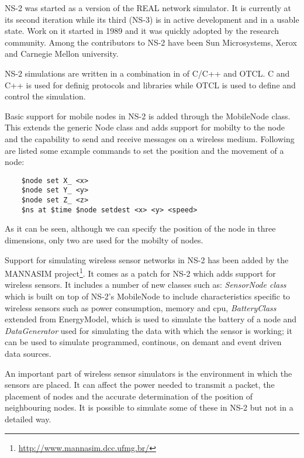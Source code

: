 \label{subsec:ns2}

NS-2 was started as a version of the REAL network simulator. It is currently at its 
second iteration while its third (NS-3) is in active development and in a usable state.
Work on it started in 1989 and it was quickly adopted by the research community.
Among the contributors to NS-2 have been Sun Microsystems, Xerox and Carnegie Mellon 
university. 

NS-2 simulations are written in a combination in of C/C++ and OTCL. C and C++ is 
used for definig protocols and libraries while OTCL is used to define and control
the simulation.

Basic support for mobile nodes in NS-2 is added through the MobileNode class. This extends
the generic Node class and adds support for mobilty to the node and the capability to
send and receive messages on a wireless medium. 
Following are listed some example commands to set the position and the movement of a node:
\lstset{numbers=none,captionpos=b,frame=single,language=C,caption=Commands to set the position and movement of a node,label=lst:saddrule}
\begin{lstlisting}
	$node set X_ <x>
	$node set Y_ <y>
	$node set Z_ <z>
	$ns at $time $node setdest <x> <y> <speed>
\end{lstlisting}
As it can be seen, although we can specify the position of the node in three dimensions,
only two are used for the mobilty of nodes.

Support for simulating wireless sensor networks in NS-2 has been added by the 
MANNASIM project\footnote{\url{http://www.mannasim.dcc.ufmg.br/}}. It comes as
a patch for NS-2 which adds support for wireless sensors. It includes a number of
new classes such as: \textit{SensorNode class} which is built on top of NS-2's MobileNode 
to include characteristics specific to wireless sensors such as power 
consumption, memory and cpu, \textit{BatteryClass} extended from EnergyModel, 
which is used to simulate
the battery of a node and \textit{DataGenerator} used for simulating the data 
with which the sensor is
working; it can be used to simulate programmed, continous, on demant and event 
driven
data sources.



An important part of wireless sensor simulators is the environment in which the sensors
are placed. It can affect the power needed to transmit a packet, the placement of nodes
and the accurate determination of the position of neighbouring nodes. It is possible to
simulate some of these in NS-2 but not in a detailed way.
